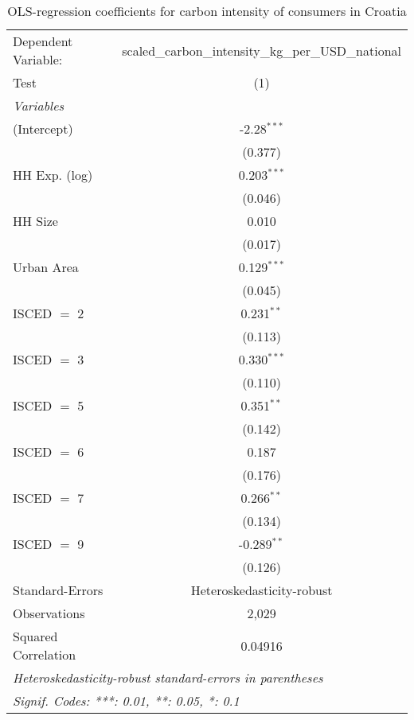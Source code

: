 
\begin{table}[htbp!]
   \centering
   \small
   \begin{adjustbox}{width = 1\textwidth, max height = 0.95\textheight, center}
      \begin{threeparttable}[b]
         \caption{\label{tab:OLS_1_HRV} OLS-regression coefficients for carbon intensity of consumers in Croatia}
         \begin{tabular}{lc}
            \tabularnewline \midrule \midrule
            Dependent Variable: & scaled\_carbon\_intensity\_kg\_per\_USD\_national\\        
            Test                & (1)\\  
            \midrule
            \emph{Variables}\\
            (Intercept)         & -2.28$^{***}$\\   
                                & (0.377)\\   
            HH Exp. (log)       & 0.203$^{***}$\\   
                                & (0.046)\\   
            HH Size             & 0.010\\   
                                & (0.017)\\   
            Urban Area          & 0.129$^{***}$\\   
                                & (0.045)\\   
            ISCED $=$ 2         & 0.231$^{**}$\\   
                                & (0.113)\\   
            ISCED $=$ 3         & 0.330$^{***}$\\   
                                & (0.110)\\   
            ISCED $=$ 5         & 0.351$^{**}$\\   
                                & (0.142)\\   
            ISCED $=$ 6         & 0.187\\   
                                & (0.176)\\   
            ISCED $=$ 7         & 0.266$^{**}$\\   
                                & (0.134)\\   
            ISCED $=$ 9         & -0.289$^{**}$\\   
                                & (0.126)\\   
            \midrule 
            Standard-Errors     & Heteroskedasticity-robust \\   
            Observations        & 2,029\\  
            Squared Correlation & 0.04916\\  
            \midrule \midrule
            \multicolumn{2}{l}{\emph{Heteroskedasticity-robust standard-errors in parentheses}}\\
            \multicolumn{2}{l}{\emph{Signif. Codes: ***: 0.01, **: 0.05, *: 0.1}}\\
         \end{tabular}
         

\end{threeparttable}
\end{adjustbox}
\end{table}
